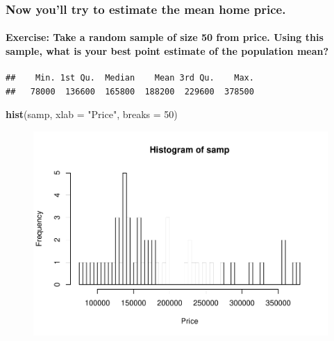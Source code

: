 \documentclass[]{article}
\newenvironment{Shaded}{\begin{snugshade}}{\end{snugshade}}
\newcommand{\KeywordTok}[1]{\textcolor[rgb]{0.13,0.29,0.53}{\textbf{{#1}}}}
\newcommand{\DataTypeTok}[1]{\textcolor[rgb]{0.13,0.29,0.53}{{#1}}}
\newcommand{\DecValTok}[1]{\textcolor[rgb]{0.00,0.00,0.81}{{#1}}}
\newcommand{\StringTok}[1]{\textcolor[rgb]{0.31,0.60,0.02}{{#1}}}
\newcommand{\NormalTok}[1]{{#1}}
\begin{document}
\subsubsection{Now you'll try to estimate the mean home
price.}\label{now-youll-try-to-estimate-the-mean-home-price.}

\paragraph{Exercise: Take a random sample of size 50 from price. Using
this sample, what is your best point estimate of the population
mean?}\label{exercise-take-a-random-sample-of-size-50-from-price.-using-this-sample-what-is-your-best-point-estimate-of-the-population-mean}

\begin{Shaded}
\end{Shaded}

\begin{verbatim}
##    Min. 1st Qu.  Median    Mean 3rd Qu.    Max. 
##   78000  136600  165800  188200  229600  378500
\end{verbatim}

\begin{Shaded}
\begin{Highlighting}[]
\KeywordTok{hist}\NormalTok{(samp, }\DataTypeTok{xlab =} \StringTok{"Price"}\NormalTok{, }\DataTypeTok{breaks =} \DecValTok{50}\NormalTok{)}
\end{Highlighting}
\end{Shaded}

\begin{figure}[htbp]
\centering
\includegraphics{Lab3A_files/figure-latex/RandomSamp50Price-1.pdf}
\caption{}
\end{figure}
\end{document}
